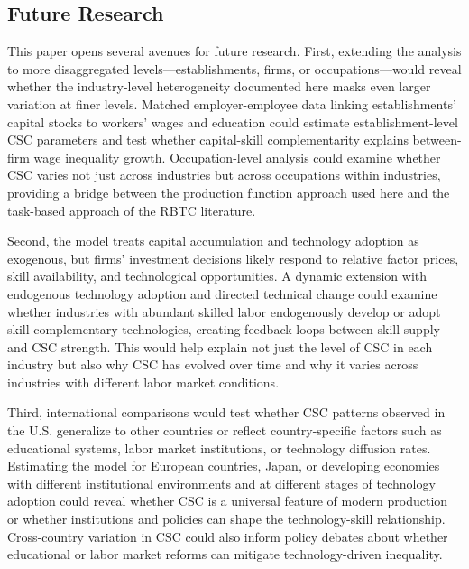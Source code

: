 \documentclass[12pt]{article}
\begin{document}
\subsection{Future Research}\label{sec:future}

This paper opens several avenues for future research. First, extending the analysis to more disaggregated levels---establishments, firms, or occupations---would reveal whether the industry-level heterogeneity documented here masks even larger variation at finer levels. Matched employer-employee data linking establishments' capital stocks to workers' wages and education could estimate establishment-level CSC parameters and test whether capital-skill complementarity explains between-firm wage inequality growth. Occupation-level analysis could examine whether CSC varies not just across industries but across occupations within industries, providing a bridge between the production function approach used here and the task-based approach of the RBTC literature.

Second, the model treats capital accumulation and technology adoption as exogenous, but firms' investment decisions likely respond to relative factor prices, skill availability, and technological opportunities. A dynamic extension with endogenous technology adoption and directed technical change could examine whether industries with abundant skilled labor endogenously develop or adopt skill-complementary technologies, creating feedback loops between skill supply and CSC strength. This would help explain not just the level of CSC in each industry but also why CSC has evolved over time and why it varies across industries with different labor market conditions.

Third, international comparisons would test whether CSC patterns observed in the U.S. generalize to other countries or reflect country-specific factors such as educational systems, labor market institutions, or technology diffusion rates. Estimating the model for European countries, Japan, or developing economies with different institutional environments and at different stages of technology adoption could reveal whether CSC is a universal feature of modern production or whether institutions and policies can shape the technology-skill relationship. Cross-country variation in CSC could also inform policy debates about whether educational or labor market reforms can mitigate technology-driven inequality.
\end{document}
